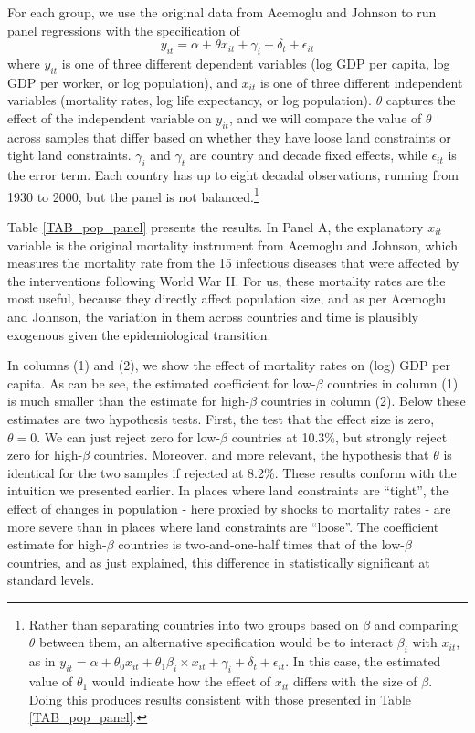 \documentclass[11pt]{article}
\begin{document}
For each group, we use the original data from Acemoglu and Johnson to run panel regressions with the specification of
\begin{equation}
    y_{it} = \alpha + \theta x_{it} + \gamma_i + \delta_t + \epsilon_{it}
\end{equation}
where $y_{it}$ is one of three different dependent variables (log GDP per capita, log GDP per worker, or log population), and $x_{it}$ is one of three different independent variables (mortality rates, log life expectancy, or log population). $\theta$ captures the effect of the independent variable on $y_{it}$, and we will compare the value of $\theta$ across samples that differ based on whether they have loose land constraints or tight land constraints. $\gamma_i$ and $\gamma_t$ are country and decade fixed effects, while $\epsilon_{it}$ is the error term. Each country has up to eight decadal observations, running from 1930 to 2000, but the panel is not balanced.\footnote{Rather than separating countries into two groups based on $\beta$ and comparing $\theta$ between them, an alternative specification would be to interact $\beta_i$ with $x_{it}$, as in $y_{it} = \alpha + \theta_0 x_{it} + \theta_1 \beta_i \times x_{it} + \gamma_i + \delta_t + \epsilon_{it}$. In this case, the estimated value of $\theta_1$ would indicate how the effect of $x_{it}$ differs with the size of $\beta$. Doing this produces results consistent with those presented in Table \ref{TAB_pop_panel}.}

Table \ref{TAB_pop_panel} presents the results. In Panel A, the explanatory $x_{it}$ variable is the original mortality instrument from Acemoglu and Johnson, which measures the mortality rate from the 15 infectious diseases that were affected by the interventions following World War II. For us, these mortality rates are the most useful, because they directly affect population size, and as per Acemoglu and Johnson, the variation in them across countries and time is plausibly exogenous given the epidemiological transition. 

In columns (1) and (2), we show the effect of mortality rates on (log) GDP per capita. As can be see, the estimated coefficient for low-$\beta$ countries in column (1) is much smaller than the estimate for high-$\beta$ countries in column (2). Below these estimates are two hypothesis tests. First, the test that the effect size is zero, $\theta=0$. We can just reject zero for low-$\beta$ countries at 10.3\%, but strongly reject zero for high-$\beta$ countries. Moreover, and more relevant, the hypothesis that $\theta$ is identical for the two samples if rejected at 8.2\%. These results conform with the intuition we presented earlier. In places where land constraints are ``tight'', the effect of changes in population - here proxied by shocks to mortality rates - are more severe than in places where land constraints are ``loose''. The coefficient estimate for high-$\beta$ countries is two-and-one-half times that of the low-$\beta$ countries, and as just explained, this difference in statistically significant at standard levels.
\end{document}
